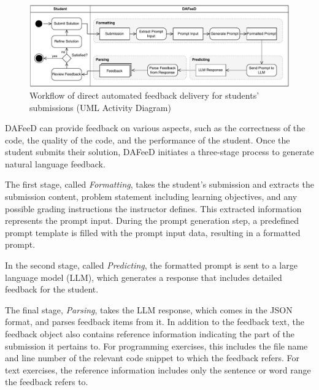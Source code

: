 \documentclass[manuscript,screen,review]{acmart}
\begin{document}
\begin{figure}[htbp]
  \centering
  \includegraphics[width=\linewidth]{figures/DAFeeD-ActivityDiagram.pdf}
  \caption{Workflow of direct automated feedback delivery for students' submissions (UML Activity Diagram)}
  \label{fig:DAFeeD-workflow}
\end{figure}

DAFeeD can provide feedback on various aspects, such as the correctness of the code, the quality of the code, and the performance of the student.
Once the student submits their solution, DAFeeD initiates a three-stage process to generate natural language feedback.

The first stage, called \textit{Formatting}, takes the student's submission and extracts the submission content, problem statement including learning objectives, and any possible grading instructions the instructor defines.
This extracted information represents the prompt input.
During the prompt generation step, a predefined prompt template is filled with the prompt input data, resulting in a formatted prompt.

In the second stage, called \textit{Predicting}, the formatted prompt is sent to a large language model (LLM), which generates a response that includes detailed feedback for the student.

The final stage, \textit{Parsing}, takes the LLM response, which comes in the JSON format, and parses feedback items from it. 
In addition to the feedback text, the feedback object also contains reference information indicating the part of the submission it pertains to.
For programming exercises, this includes the file name and line number of the relevant code snippet to which the feedback refers.
For text exercises, the reference information includes only the sentence or word range the feedback refers to.
\end{document}
